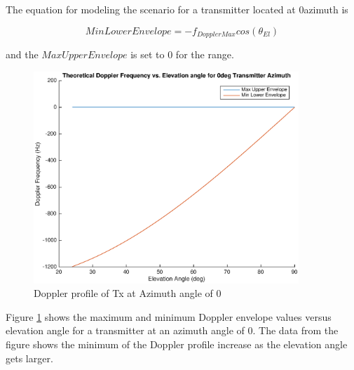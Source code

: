 The equation for modeling the scenario for a transmitter located at 0\textdegree \space azimuth is

\begin{equation}
	MinLowerEnvelope = -f_{DopplerMax}cos(\theta_{El})
	\label{eq:theory_0_lower}
\end{equation}

and the $MaxUpperEnvelope$ is set to 0 for the range.

\begin{figure}
	\begin{center}
		\includegraphics[width=10cm]{images/background/3d_geometry_tx_0az_doppler_profile.eps}
		\caption{Doppler profile of Tx at Azimuth angle of 0\textdegree}
		\label{fig:3D_model_0az_doppler}
	\end{center}
\end{figure}

Figure \ref{fig:3D_model_0az_doppler} shows the maximum and minimum Doppler envelope values versus elevation angle for a transmitter at an azimuth angle of 0\textdegree. The data from the figure shows the minimum of the Doppler profile increase as the elevation angle gets larger.
